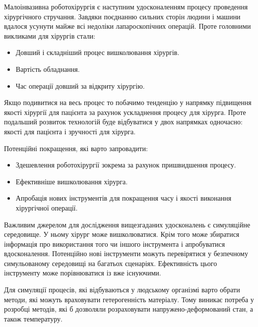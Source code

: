 Малоінвазивна роботохірургія є наступним удосконаленням процесу проведення хірургічного стручання. Завдяки поєднанню 
сильних сторін людини і машини вдалося усунути майже всі недоліки лапароскопічних операцій. Проте головними викликами 
для хірургів стали:
\begin{itemize}
  \item Довший і складніший процес вишколювання хірургів.
  \item Вартість обладнання.
  \item Час операції довший за відкриту хірургію.
\end{itemize}

Якщо подивитися на весь процес то побачимо тенденцію у напрямку підвищення якості хірургії для пацієнта за рахунок 
ускладнення процесу для хірурга. Проте подальший розвиток технологій буде відбуватися у двох напрямках одночасно: якості
для пацієнта і зручності для хірурга.

Потенційні покращення, які варто запровадити: 
\begin{itemize}
  \item Здешевлення роботохірургії зокрема за рахунок пришвидшення процесу.
  \item Ефективніше вишколювання хірурга.
  \item Апробація нових інструментів для покращення часу і якості виконання хірургічної операції.
\end{itemize}

Важливим джерелом для дослідження вищезгаданих удосконалень є симуляційне середовище. У ньому хірург може вишколюватися.
Крім того може збиратися інформація про використання того чи іншого інструмента і апробуватися вдосконалення. Потенційно
нові інструменти можуть перевірятися у безпечному симульованому середовищі на багатьох сценаріях. Ефективність цього 
інструменту може порівнюватися із вже існуючими.

Для симуляції процесів, які відбуваються у людському організмі варто обрати методи, які можуть враховувати
гетерогенність матеріалу. Тому виникає потреба у розробці методів, які б дозволяли розраховувати напружено-деформований
стан, а також температуру.

